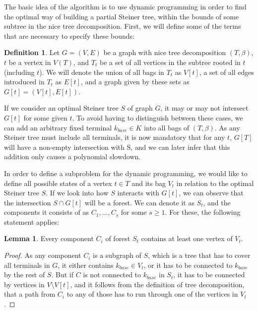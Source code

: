 \documentclass[thesis=M,english,hidelinks]{FITthesis}[2012/10/20]
\theoremstyle{definition}
\newtheorem{definition}{Definition}
\newtheorem{lemma}{Lemma}
\begin{document}
The basic idea of the algorithm is to use dynamic programming in order to find the optimal way of building a partial
Steiner tree, within the bounds of some subtree in the nice tree decomposition. First, we will define some of the terms
that are necessary to specify these bounds:

\begin{definition}
    Let $G = (V, E)$ be a graph with nice tree decomposition $(T, \beta)$, $t$ be a vertex in $V(T)$, and $T_t$ be a set of all
    vertices in the subtree rooted in $t$ (including $t$). We will denote the union of all bags in $T_t$ as $V[t]$, a
    set of all edges introduced in $T_t$ as $E[t]$, and a graph given by these sets as $G[t] = (V[t], E[t])$.
\end{definition}

If we consider an optimal Steiner tree $S$ of graph $G$, it may or may not intersect $G[t]$ for some given $t$. To avoid
having to distinguish between these cases, we can add an arbitrary fixed terminal $k_{base} \in K$ into all bags of $(T,
\beta)$. As any Steiner tree must include all terminals, it is now mandatory that for any $t$, $G[T]$ will have a
non-empty intersection with S, and we can later infer that this addition only causes a polynomial slowdown.

In order to define a subproblem for the dynamic programming, we would like to define all possible states of a vertex $t
\in T$ and its bag $V_t$ in relation to the optimal Steiner tree $S$. If we look into how $S$ interacts with $G[t]$, we
can observe that the intersection $S \cap G[t]$ will be a forest. We can denote it as $S_t$, and the 
components it consists of as $C_1, \ldots, C_s$ for some $s \geq 1$. For these, the following statement applies:

\begin{lemma}
    \label{lemma:repre}
    Every component $C_i$ of forest $S_t$ contains at least one vertex of $V_t$.
\end{lemma}

\begin{proof}
    As any component $C_i$ is a subgraph of $S$, which is a tree that has to cover all terminals in $G$, it either
    contains $k_{base} \in V_t$, or it has to be connected to $k_{base}$ by the rest of $S$. But if $C$ is not connected
    to $k_{base}$ in $S_t$, it has to be connected by vertices in $V \setminus V[t]$, and it follows from the definition
    of tree decomposition, that a path from $C_i$ to any of those has to run through one of the vertices in $V_t$.
\end{proof}
\end{document}
